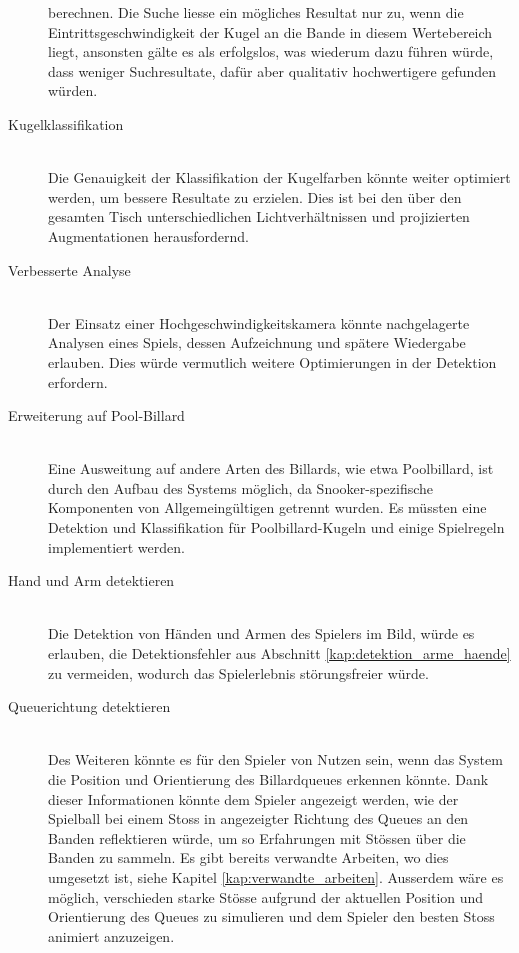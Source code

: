 \begin{description}
    berechnen. Die Suche liesse ein mögliches Resultat nur zu, wenn die Eintrittsgeschwindigkeit der Kugel an die Bande
    in diesem Wertebereich liegt, ansonsten gälte es als erfolgslos, was wiederum dazu führen würde,
    dass weniger Suchresultate, dafür aber qualitativ hochwertigere gefunden würden.
    \item[Kugelklassifikation]\mbox{} \\
    Die Genauigkeit der Klassifikation der Kugelfarben könnte weiter optimiert werden, um bessere Resultate zu erzielen.
    Dies ist bei den über den gesamten Tisch unterschiedlichen Lichtverhältnissen und projizierten Augmentationen herausfordernd.
    \item[Verbesserte Analyse]\mbox{} \\
    Der Einsatz einer Hochgeschwindigkeitskamera könnte nachgelagerte Analysen eines Spiels,
    dessen Aufzeichnung und spätere Wiedergabe erlauben.
    Dies würde vermutlich weitere Optimierungen in der Detektion erfordern.
    \item[Erweiterung auf Pool-Billard]\mbox{} \\
    Eine Ausweitung auf andere Arten des Billards, wie etwa Poolbillard, ist durch den Aufbau des Systems möglich, da
    Snooker-spezifische Komponenten von Allgemeingültigen getrennt wurden.
    Es müssten eine Detektion und Klassifikation für Poolbillard-Kugeln und einige Spielregeln implementiert werden.
    \item[Hand und Arm detektieren]\mbox{} \\
    Die Detektion von Händen und Armen des Spielers im Bild, würde es erlauben,
    die Detektionsfehler aus Abschnitt \ref{kap:detektion_arme_haende} zu vermeiden, wodurch das Spielerlebnis störungsfreier würde.
    \item[Queuerichtung detektieren]\mbox{} \\
    Des Weiteren könnte es für den Spieler von Nutzen sein, wenn das System die Position und Orientierung des Billardqueues
    erkennen könnte.
    Dank dieser Informationen könnte dem Spieler angezeigt werden, wie der Spielball bei einem Stoss in angezeigter Richtung des Queues
    an den Banden reflektieren würde, um so Erfahrungen mit Stössen über die Banden zu sammeln.
    Es gibt bereits verwandte Arbeiten, wo dies umgesetzt ist, siehe Kapitel \ref{kap:verwandte_arbeiten}.
    Ausserdem wäre es möglich, verschieden starke Stösse aufgrund der aktuellen Position und Orientierung des Queues zu simulieren
    und dem Spieler den besten Stoss animiert anzuzeigen.

\end{description}

